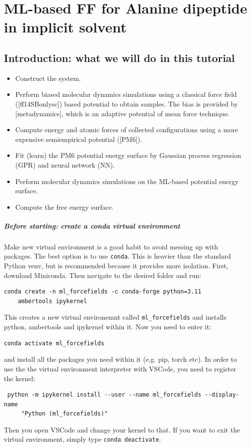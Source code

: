 \chapter{ML-based FF for Alanine dipeptide in implicit solvent}

\section{Introduction: what we will do in this tutorial}
\begin{itemize}
\item Construct the system.
\item Perform biased molecular dynamics simulations using a classical force field ([ff14SBonlysc]) based potential to obtain samples. The bias is provided by [metadynamics], which is an adaptive potential of mean force technique.
\item Compute energy and atomic forces of collected configurations using a more expensive semiempirical potential ([PM6]).
\item Fit (learn) the PM6 potential energy surface by Gaussian process regression (GPR) and neural network (NN).
\item Perform molecular dynamics simulations on the ML-based potential energy surface.
\item Compute the free energy surface.
\end{itemize}





\paragraph{Before starting: create a conda virtual environment}
Make new virtual environment is a good habit to avoid messing up with packages. 
The best option is to use \texttt{conda}. This is heavier than the standard Python venv,
but is recommended because it provides more isolation. First, download Miniconda. Then navigate to the desired folder and run:

\begin{verbatim}
conda create -n ml_forcefields -c conda-forge python=3.11 
    ambertools ipykernel
\end{verbatim}
This creates a new virtual environemnt called \texttt{ml\_forcefields} and installs python,
ambertools and ipykernel within it. Now you need to enter it:
\begin{verbatim}
conda activate ml_forcefields
\end{verbatim}
and install all the packages you need within it (e.g. pip, torch etc). In order to use
the the virtual environment interpreter with VSCode, you need to register
the kernel:
\begin{verbatim}
 python -m ipykernel install --user --name ml_forcefields --display-name
     "Python (ml_forcefields)"
\end{verbatim}
Then you open VSCode and change your kernel to that. If you want to exit the virtual environment,
simply type \texttt{conda deactivate}.


